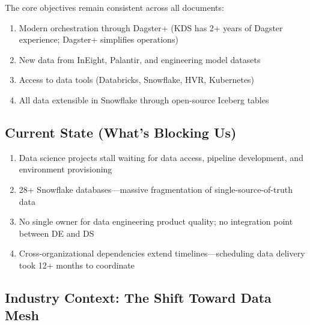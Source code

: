 \documentclass[12pt, a4paper]{article}
\begin{document}
\noindent The core objectives remain consistent across all documents:
\begin{enumerate}
    \item Modern orchestration through Dagster+ (KDS has 2+ years of Dagster experience; Dagster+ simplifies operations)
    \item New data from InEight, Palantir, and engineering model datasets
    \item Access to data tools (Databricks, Snowflake, HVR, Kubernetes)
    \item All data extensible in Snowflake through open-source Iceberg tables
\end{enumerate}

\subsection{Current State (What's Blocking Us)}
\begin{enumerate}
    \item Data science projects stall waiting for data access, pipeline development, and environment provisioning
    \item 28+ Snowflake databases—massive fragmentation of single-source-of-truth data
    \item No single owner for data engineering product quality; no integration point between DE and DS
    \item Cross-organizational dependencies extend timelines—scheduling data delivery took 12+ months to coordinate
\end{enumerate}

\subsection{Industry Context: The Shift Toward Data Mesh}

\begin{figure}
\vspace{-1em}
\vspace{-1em}
\end{figure}
\end{document}
